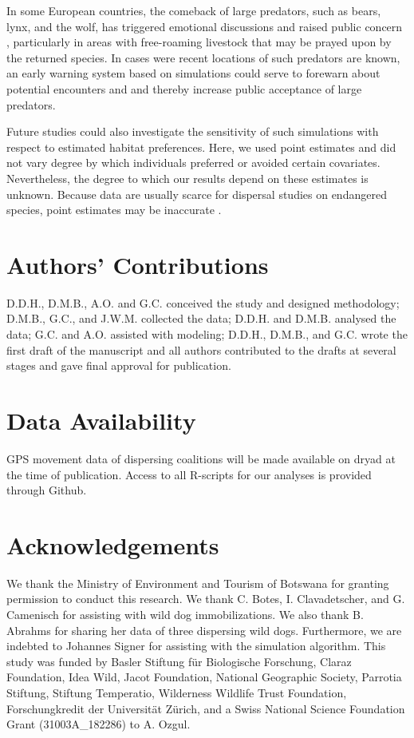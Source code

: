 \documentclass[abstract=on,10pt,a4paper,bibliography=totocnumbered]{article}
\begin{document}
In some European countries, the comeback of large predators, such as bears,
lynx, and the wolf, has triggered emotional discussions and raised public
concern \citep{Behr.2017}, particularly in areas with free-roaming livestock
that may be prayed upon by the returned species. In cases were recent locations
of such predators are known, an early warning system based on simulations could
serve to forewarn about potential encounters and and thereby increase public
acceptance of large predators.

Future studies could also investigate the sensitivity of such simulations with
respect to estimated habitat preferences. Here, we used point estimates and did
not vary degree by which individuals preferred or avoided certain covariates.
Nevertheless, the degree to which our results depend on these estimates is
unknown. Because data are usually scarce for dispersal studies on endangered
species, point estimates may be inaccurate \citep{Wiegand.2003,
KramerSchadt.2007}.

\section{Authors' Contributions}
D.D.H., D.M.B., A.O. and G.C. conceived the study and designed methodology;
D.M.B., G.C., and J.W.M. collected the data; D.D.H. and D.M.B. analysed the
data; G.C. and A.O. assisted with modeling; D.D.H., D.M.B., and G.C. wrote the
first draft of the manuscript and all authors contributed to the drafts at
several stages and gave final approval for publication.

\section{Data Availability}
GPS movement data of dispersing coalitions will be made available on dryad at
the time of publication. Access to all R-scripts for our analyses is provided
through Github.

\section{Acknowledgements}
We thank the Ministry of Environment and Tourism of Botswana for granting
permission to conduct this research. We thank C. Botes, I. Clavadetscher, and G.
Camenisch for assisting with wild dog immobilizations. We also thank B. Abrahms
for sharing her data of three dispersing wild dogs. Furthermore, we are indebted
to Johannes Signer for assisting with the simulation algorithm. This study was
funded by Basler Stiftung für Biologische Forschung, Claraz Foundation, Idea
Wild, Jacot Foundation, National Geographic Society, Parrotia Stiftung, Stiftung
Temperatio, Wilderness Wildlife Trust Foundation, Forschungkredit der
Universität Zürich, and a Swiss National Science Foundation Grant
(31003A\_182286) to A. Ozgul.

\newpage
\begingroup
\singlespacing

\endgroup
\end{document}
